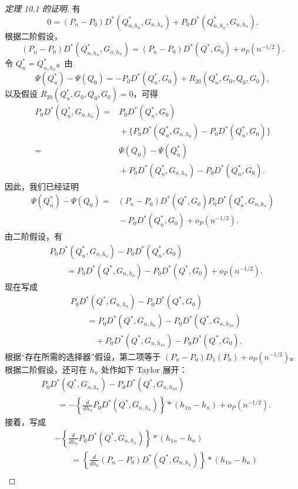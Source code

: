\begin{proof}[定理 10.1 的证明]
有
\[
 0=(P_n-P_0)D^*(Q_{n,h_n}^*,G_{n,h_n})
   +P_0D^*(Q_{n,h_n}^*,G_{n,h_n}).
\]
根据二阶假设，
\[
 (P_n-P_0)D^*(Q_{n,h_n}^*,G_{n,h_n})
 =(P_n-P_0)D^*(Q^*,G_0)+o_P(n^{-1/2}).
\]
令 $Q_n^*=Q_{n,h_n}^*$。由
\[
 \Psi(Q_n^*)-\Psi(Q_0)
 =-P_0D^*(Q_n^*,G_0)+R_{20}(Q_n^*,G_0,Q_0,G_0),
\]
以及假设 $R_{20}(Q_n^*,G_0,Q_0,G_0)=0$，可得
\[
 \begin{aligned}
 P_0D^*(Q_n^*,G_{n,h_n})
 ={}&P_0D^*(Q_n^*,G_0)\\
    &{}+\{P_0D^*(Q_n^*,G_{n,h_n})-P_0D^*(Q_n^*,G_0)\}\\
 ={}&\Psi(Q_0)-\Psi(Q_n^*)\\
    &{}+P_0D^*(Q_n^*,G_{n,h_n})-P_0D^*(Q_n^*,G_0).
 \end{aligned}
\]
因此，我们已经证明
\[
 \begin{aligned}
 \Psi(Q_n^*)-\Psi(Q_0)
 ={}&(P_n-P_0)D^*(Q^*,G_0)P_0D^*(Q_n^*,G_{n,h_n})\\
    &{}-P_0D^*(Q_n^*,G_0)+o_P(n^{-1/2}).
 \end{aligned}
\]
由二阶假设，有
\[
 \begin{aligned}
 &P_0D^*(Q_n^*,G_{n,h_n})-P_0D^*(Q_n^*,G_0)\\
 &\qquad=P_0D^*(Q^*,G_{n,h_n})-P_0D^*(Q^*,G_0)
        +o_P(n^{-1/2}).
 \end{aligned}
\]
现在写成
\[
 \begin{aligned}
 &P_0D^*(Q^*,G_{n,h_n})-P_0D^*(Q^*,G_0)\\
 &\qquad=P_0D^*(Q^*,G_{n,h_n})-P_0D^*(Q^*,G_{n,h_{1n}})\\
 &\qquad\quad{}+P_0D^*(Q^*,G_{n,h_{1n}})-P_0D^*(Q^*,G_0).
 \end{aligned}
\]
根据“存在所需的选择器”假设，第二项等于
$(P_n-P_0)D_1(P_0)+o_P(n^{-1/2})$。
根据二阶假设，还可在 $h_n$ 处作如下 Taylor 展开：
\[
 \begin{aligned}
 &P_0D^*(Q^*,G_{n,h_n})-P_0D^*(Q^*,G_{n,h_{1n}})\\
 &\qquad=-\left\{\frac{d}{dh_n}P_0D^*(Q^*,G_{n,h_n})\right\}
          \ast(h_{1n}-h_n)+o_P(n^{-1/2}).
 \end{aligned}
\]
接着，写成
\[
 \begin{aligned}
 &-\left\{\frac{d}{dh_n}P_0D^*(Q^*,G_{n,h_n})\right\}
        \ast(h_{1n}-h_n)\\
 &\qquad=\left\{\frac{d}{dh_n}(P_n-P_0)D^*(Q^*,G_{n,h_n})\right\}
        \ast(h_{1n}-h_n)\\

\end{aligned}\]
\end{proof}
